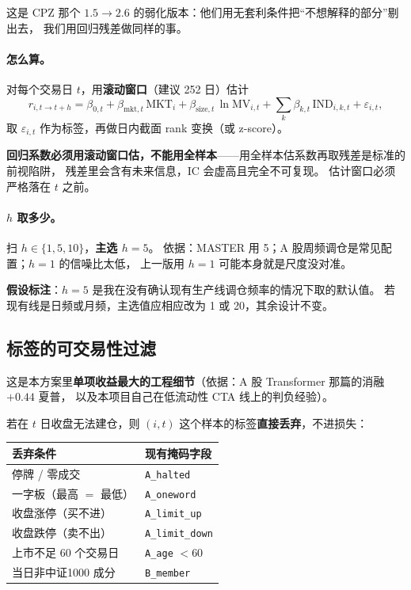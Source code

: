 \documentclass[11pt, a4paper]{ctexart}
\newcommand{\file}[1]{\texttt{\small #1}}
\begin{document}
这是 CPZ 那个 $1.5 \to 2.6$ 的弱化版本：他们用无套利条件把“不想解释的部分”剔出去，
我们用回归残差做同样的事。

\paragraph{怎么算。}对每个交易日 $t$，用\textbf{滚动窗口}（建议 252 日）估计
\begin{equation}
r_{i,t\to t+h} = \beta_{0,t} + \beta_{\text{mkt},t}\,\text{MKT}_i
 + \beta_{\text{size},t}\,\ln \text{MV}_{i,t} + \sum_k \beta_{k,t}\,\text{IND}_{i,k,t}
 + \varepsilon_{i,t},
\end{equation}
取 $\varepsilon_{i,t}$ 作为标签，再做日内截面 rank 变换（或 z-score）。

\begin{warnbox}
\textbf{回归系数必须用滚动窗口估，不能用全样本}——用全样本估系数再取残差是标准的前视陷阱，
残差里会含有未来信息，IC 会虚高且完全不可复现。
估计窗口必须严格落在 $t$ 之前。
\end{warnbox}

\paragraph{$h$ 取多少。}扫 $h \in \{1, 5, 10\}$，\textbf{主选 $h=5$}。
依据：MASTER 用 5；A 股周频调仓是常见配置；$h=1$ 的信噪比太低，
上一版用 $h=1$ 可能本身就是尺度没对准。

\begin{warnbox}
\textbf{假设标注}：$h=5$ 是我在没有确认现有生产线调仓频率的情况下取的默认值。
若现有线是日频或月频，主选值应相应改为 1 或 20，其余设计不变。
\end{warnbox}

\subsection{标签的可交易性过滤}
\label{sec:tradable-label}

这是本方案里\textbf{单项收益最大的工程细节}（依据：A 股 Transformer 那篇的消融 $+0.44$ 夏普，
以及本项目自己在低流动性 CTA 线上的判负经验）。

若在 $t$ 日收盘无法建仓，则 $(i,t)$ 这个样本的标签\textbf{直接丢弃}，不进损失：

\begin{center}
\small
\begin{tabular}{ll}
\toprule
丢弃条件 & 现有掩码字段 \\
\midrule
停牌 / 零成交 & \file{A\_halted} \\
一字板（最高 $=$ 最低） & \file{A\_oneword} \\
收盘涨停（买不进） & \file{A\_limit\_up} \\
收盘跌停（卖不出） & \file{A\_limit\_down} \\
上市不足 60 个交易日 & \file{A\_age} $< 60$ \\
当日非中证1000 成分 & \file{B\_member} \\
\bottomrule
\end{tabular}
\end{center}
\end{document}
